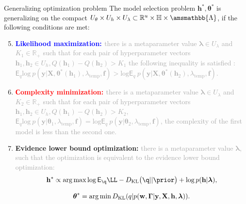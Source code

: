 \documentclass[usenames,dvipsnames,11pt,pdf,utf8,russian,aspectratio=43]{beamer}
\DeclareMathOperator*{\argmin}{arg\,min}
\DeclareMathOperator*{\argmax}{arg\,max}
\begin{document}
\begin{frame}{Generalizing optimization problem}
\footnotesize
The model selection problem  $\mathbf{h}^{*}, \boldsymbol{\theta}^{*}$ is generalizing on the compact $U_{\theta}\times U_{h} \times U_{\lambda} \subset \mathbb{R}^{u} \times \mathbb{H} \times \amsmathbb{\Lambda}$, if the following conditions are met:
\begin{enumerate}
\setcounter{enumi}{4}
\item \textbf{ \textcolor{blue}{Likelihood maximization: }}\textcolor{darkgray}{ there is a metaparameter value $\boldsymbol{\lambda} \in U_{\lambda}$ and  $K_1 \in \mathbb{R}_{+}$ such that for each pair of hyperparameter vectors $\mathbf{h}_1, \mathbf{h}_2 \in  U_{h}, Q(\mathbf{h}_1) - Q(\mathbf{h}_2) > K_1$ the following inequality is satisfied : $\mathsf{E}_q \text{log}~p(\mathbf{y}|\mathbf{X}, \boldsymbol{\theta}^{*}(\mathbf{h}_1), \lambda_{\text{temp}}, \mathbf{f})>\text{log}\mathsf{E}_q ~p(\mathbf{y}|\mathbf{X}, \boldsymbol{\theta}^{*}(\mathbf{h}_2), \lambda_{\text{temp}}, \mathbf{f})$.}

\item \textbf{\textcolor{red}{Сomplexity minimization: }}\textcolor{darkgray}{ there is a metaparameter value  $\boldsymbol{\lambda} \in U_{\lambda}$ and $K_2 \in \mathbb{R}_{+}$ such that for each pair of hyperparameter vectors $\mathbf{h}_1, \mathbf{h}_2 \in U_h, Q(\mathbf{h}_1) - Q(\mathbf{h}_2) > K_2$,  $\mathsf{E}_q \text{log}~p(\mathbf{y}|\boldsymbol{\theta}_1, \lambda_{\text{temp}}, \mathbf{f}) = \text{log}\mathsf{E}_q ~p(\mathbf{y}|\boldsymbol{\theta}_2, \lambda_{\text{temp}}, \mathbf{f})$, the complexity of the first model is less than the second one.}

\item \textbf{Evidence lower bound optimization: }\textcolor{darkgray}{ there is a metaparameter value  $\boldsymbol{\lambda}$, such that the optimization is equivalent to the evidence lower bound optimization:
\vspace{-0.2cm}
\[
    \mathbf{h}^{*} \propto \argmax_{} \log \E_{\q} \LL - \KL{\q}{\prior} + \log p(\mathbf{h}|\boldsymbol{\lambda}),
\]
\[
    \boldsymbol{\theta}^{*} = \argmin D_\text{KL}(q| p(\mathbf{w}, \boldsymbol{\Gamma}|\mathbf{y}, \mathbf{X}, \h, \lam)).
\]}
\vspace{-0.6cm}
\end{enumerate}
\end{frame}
\end{document}
